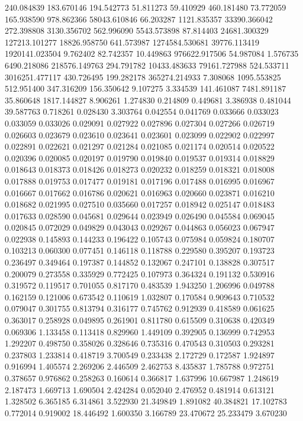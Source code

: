 240.084839
183.670146
194.542773
51.811273
59.410929
460.181480
73.772059
165.938590
978.862366
58043.610846
66.203287
1121.835357
33390.366042
272.398808
3130.356702
562.996090
5543.573898
87.814403
24681.300329
127213.101277
18826.958750
641.573987
1274584.530681
39776.113419
1920141.023504
9.762402
82.742357
10.449863
976622.917506
54.987084
1.576735
6490.218086
218576.149763
294.791782
10433.483633
79161.727988
524.533711
3016251.477117
430.726495
199.282178
365274.214933
7.308068
1095.553825
512.951400
347.316209
156.350642
9.107275
3.334539
141.461087
7481.891187
35.860648
1817.144827
8.906261
1.274830
0.214809
0.449681
3.386938
0.481044
39.587763
0.718261
0.028430
3.303764
0.042554
0.041769
0.033666
0.033023
0.033059
0.033026
0.029091
0.027922
0.027896
0.027304
0.027266
0.026719
0.026603
0.023679
0.023610
0.023641
0.023601
0.023099
0.022902
0.022997
0.022891
0.022621
0.021297
0.021284
0.021085
0.021174
0.020514
0.020522
0.020396
0.020085
0.020197
0.019790
0.019840
0.019537
0.019314
0.018829
0.018643
0.018373
0.018426
0.018273
0.020232
0.018259
0.018321
0.018008
0.017888
0.019753
0.017477
0.019181
0.017196
0.017488
0.016995
0.016967
0.016667
0.017662
0.016786
0.020621
0.016963
0.020660
0.023871
0.016210
0.018682
0.021995
0.027510
0.035660
0.017257
0.018942
0.025147
0.018483
0.017633
0.028590
0.045681
0.029644
0.023949
0.026490
0.045584
0.069045
0.020845
0.072029
0.049829
0.043043
0.029267
0.044863
0.056023
0.067947
0.022938
0.145893
0.144233
0.196422
0.105743
0.075984
0.059824
0.180707
0.103213
0.060300
0.077451
0.146118
0.118788
0.229580
0.395207
0.193723
0.236497
0.349464
0.197387
0.144852
0.132067
0.247101
0.138828
0.307517
0.200079
0.273558
0.335929
0.772425
0.107973
0.364324
0.191132
0.530916
0.319572
0.119517
0.701055
0.817170
0.483539
1.943250
1.206996
0.049788
0.162159
0.121006
0.673542
0.110619
1.032807
0.170584
0.909643
0.710532
0.079047
0.301755
0.813794
0.316177
0.745762
0.912939
0.418589
0.061625
0.363017
0.258928
0.049895
0.261901
0.811780
0.615509
0.310638
0.420349
0.069306
1.133458
0.113418
0.829960
1.449109
0.392905
0.136999
0.742953
1.292207
0.498750
0.358026
0.328646
0.735316
0.470543
0.310503
0.293281
0.237803
1.233814
0.418719
3.700549
0.233438
2.172729
0.172587
1.924897
0.916994
1.405574
2.269206
2.446509
2.462753
8.435837
1.785788
0.972751
0.378657
0.976862
0.258263
0.160614
0.366817
1.637996
10.667987
1.248619
2.187473
1.669713
1.690504
2.424284
0.052040
2.476952
0.481914
0.613121
1.328502
6.365185
6.314861
3.522930
21.349849
1.891082
40.384821
17.102783
0.772014
0.919002
18.446492
1.600350
3.166789
23.470672
25.233479
3.670230
